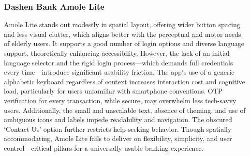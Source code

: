 \documentclass[a4paper,12pt]{report}
\begin{document}
\subsubsection{Dashen Bank Amole Lite}
Amole Lite stands out modestly in spatial layout, offering wider button spacing and less visual clutter, which aligns better with the perceptual and motor needs of elderly users. It supports a good number of login options and diverse language support, theoretically enhancing accessibility. However, the lack of an initial language selector and the rigid login process—which demands full credentials every time—introduce significant usability friction. The app’s use of a generic alphabetic keyboard regardless of context increases interaction cost and cognitive load, particularly for users unfamiliar with smartphone conventions. OTP verification for every transaction, while secure, may overwhelm less tech-savvy users. Additionally, the small and unscalable text, absence of theming, and use of ambiguous icons and labels impede readability and navigation. The obscured ‘Contact Us’ option further restricts help-seeking behavior. Though spatially accommodating, Amole Lite fails to deliver on flexibility, simplicity, and user control—critical pillars for a universally usable banking experience.
\end{document}

